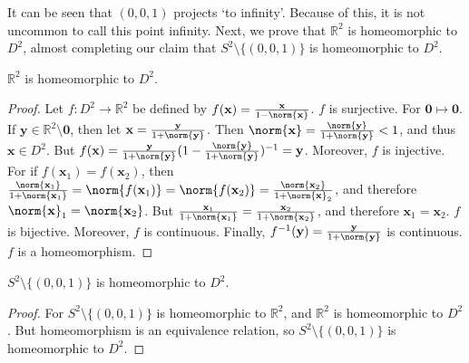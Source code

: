 \documentclass[crop=false,class=article,oneside]{standalone}
\begin{document}
        It can be seen that $(0,0,1)$ projects `to infinity'.
        Because of this, it is not uncommon to call this point
        infinity. Next, we prove that $\mathbb{R}^{2}$ is
        homeomorphic to $D^{2}$, almost completing our claim
        that $S^{2}\setminus\{(0,0,1)\}$
        is homeomorphic to $D^{2}$.
        \begin{theorem}
            $\mathbb{R}^{2}$ is homeomorphic to $D^{2}$.
        \end{theorem}
        \begin{proof}
            Let $f:D^{2}\rightarrow\mathbb{R}^{2}$
            be defined by
            $f(\mathbf{x})%
             =\frac{\mathbf{x}}{1-\norm{\mathbf{x}}}$.
            $f$ is surjective.
            For $\mathbf{0}\mapsto\mathbf{0}$.
            If $\mathbf{y}\in\mathbb{R}^2\setminus\mathbf{0}$,
            then let
            $\mathbf{x}=\frac{\mathbf{y}}{1+\norm{\mathbf{y}}}$.
            Then
            $\norm{\mathbf{x}}%
             =\frac{\norm{\mathbf{y}}}{1+\norm{\mathbf{y}}}<1$,
            and thus $\mathbf{x}\in D^{2}$.
            But
            $f(\mathbf{x})%
             =\frac{\mathbf{y}}{1+\norm{\mathbf{y}}}%
              (1-\frac{\norm{\mathbf{y}}}%
                      {1+\norm{\mathbf{y}}})^{-1}%
             =\mathbf{y}$.
            Moreover, $f$ is injective.
            For if
            $f(\mathbf{x}_{1})=f(\mathbf{x}_{2})$,
            then
            $\frac{\norm{\mathbf{x}_{1}}}%
             {1+\norm{\mathbf{x}_{1}}}%
             =\norm{f(\mathbf{x}_{1})}%
             =\norm{f(\mathbf{x}_{2})}%
             =\frac{\norm{\mathbf{x}_{2}}}%
              {1+\norm{\mathbf{x}}_{2}}$,
            and therefore
            $\norm{\mathbf{x}}_{1}=\norm{\mathbf{x}_{2}}$.
            But
            $\frac{\mathbf{x}_{1}}{1+\norm{\mathbf{x}_{1}}}%
             =\frac{\mathbf{x}_{2}}{1+\norm{\mathbf{x}_{2}}}$,
            and therefore $\mathbf{x}_{1}=\mathbf{x}_{2}$.
            $f$ is bijective.
            Moreover, $f$ is continuous. Finally,
            $f^{-1}(\mathbf{y})%
             =\frac{\mathbf{y}}{1+\norm{\mathbf{y}}}$
            is continuous. $f$ is a homeomorphism.
        \end{proof}
        \begin{theorem}
            $S^{2}\setminus\{(0,0,1)\}$
            is homeomorphic to $D^{2}$.
        \end{theorem}
        \begin{proof}
            For $S^{2}\setminus\{(0,0,1)\}$ is
            homeomorphic to $\mathbb{R}^{2}$, and
            $\mathbb{R}^{2}$ is homeomorphic to $D^{2}$.
            But homeomorphism is an equivalence relation, so
            $S^{2}\setminus\{(0,0,1)\}$
            is homeomorphic to $D^{2}$.
        \end{proof}
\end{document}
